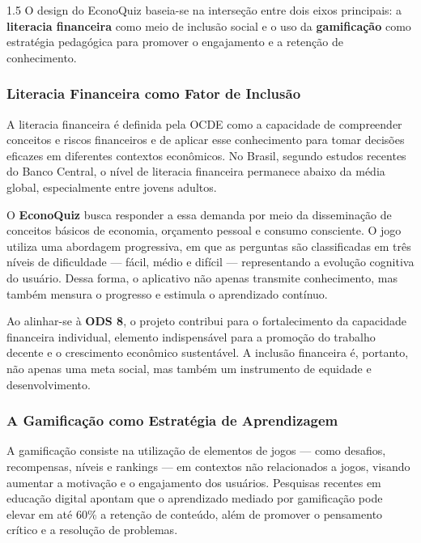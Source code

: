 \documentclass[a4paper, 12pt]{article}
\begin{document}
\begin{spacing}{1.5}
O design do EconoQuiz baseia-se na interseção entre dois eixos principais: a \textbf{literacia financeira} como meio de inclusão social e o uso da \textbf{gamificação} como estratégia pedagógica para promover o engajamento e a retenção de conhecimento.

\subsubsection{Literacia Financeira como Fator de Inclusão}

A literacia financeira é definida pela OCDE como a capacidade de compreender conceitos e riscos financeiros e de aplicar esse conhecimento para tomar decisões eficazes em diferentes contextos econômicos. No Brasil, segundo estudos recentes do Banco Central, o nível de literacia financeira permanece abaixo da média global, especialmente entre jovens adultos.

O \textbf{EconoQuiz} busca responder a essa demanda por meio da disseminação de conceitos básicos de economia, orçamento pessoal e consumo consciente. O jogo utiliza uma abordagem progressiva, em que as perguntas são classificadas em três níveis de dificuldade — fácil, médio e difícil — representando a evolução cognitiva do usuário. Dessa forma, o aplicativo não apenas transmite conhecimento, mas também mensura o progresso e estimula o aprendizado contínuo.

Ao alinhar-se à \textbf{ODS 8}, o projeto contribui para o fortalecimento da capacidade financeira individual, elemento indispensável para a promoção do trabalho decente e o crescimento econômico sustentável. A inclusão financeira é, portanto, não apenas uma meta social, mas também um instrumento de equidade e desenvolvimento.

\subsubsection{A Gamificação como Estratégia de Aprendizagem}

A gamificação consiste na utilização de elementos de jogos — como desafios, recompensas, níveis e rankings — em contextos não relacionados a jogos, visando aumentar a motivação e o engajamento dos usuários. Pesquisas recentes em educação digital apontam que o aprendizado mediado por gamificação pode elevar em até 60\% a retenção de conteúdo, além de promover o pensamento crítico e a resolução de problemas.


\end{spacing}
\end{document}
